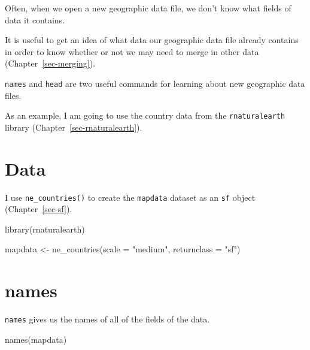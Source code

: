 \documentclass[
  letterpaper,
  DIV=11,
  numbers=noendperiod,
  oneside]{scrreprt}
\newenvironment{Shaded}{\begin{snugshade}}{\end{snugshade}}
\newcommand{\AttributeTok}[1]{\textcolor[rgb]{0.40,0.45,0.13}{#1}}
\newcommand{\FunctionTok}[1]{\textcolor[rgb]{0.28,0.35,0.67}{#1}}
\newcommand{\NormalTok}[1]{\textcolor[rgb]{0.00,0.23,0.31}{#1}}
\newcommand{\OtherTok}[1]{\textcolor[rgb]{0.00,0.23,0.31}{#1}}
\newcommand{\StringTok}[1]{\textcolor[rgb]{0.13,0.47,0.30}{#1}}
\begin{document}
Often, when we open a new geographic data file, we don't know what
fields of data it contains.

It is useful to get an idea of what data our geographic data file
already contains in order to know whether or not we may need to merge in
other data (Chapter~\ref{sec-merging}).

\texttt{names} and \texttt{head} are two useful commands for learning
about new geographic data files.

As an example, I am going to use the country data from the
\texttt{rnaturalearth} library (Chapter~\ref{sec-rnaturalearth}).

\section{Data}\label{data}

I use \texttt{ne\_countries()} to create the \texttt{mapdata} dataset as
an \texttt{sf} object (Chapter~\ref{sec-sf}).

\begin{Shaded}
\begin{Highlighting}[]
\FunctionTok{library}\NormalTok{(rnaturalearth) }

\NormalTok{mapdata }\OtherTok{\textless{}{-}} \FunctionTok{ne\_countries}\NormalTok{(}\AttributeTok{scale =} \StringTok{"medium"}\NormalTok{, }
                        \AttributeTok{returnclass =} \StringTok{"sf"}\NormalTok{) }
\end{Highlighting}
\end{Shaded}

\section{names}\label{names}

\texttt{names} gives us the names of all of the fields of the data.

\begin{Shaded}
\begin{Highlighting}[]
\FunctionTok{names}\NormalTok{(mapdata)}
\end{Highlighting}
\end{Shaded}
\end{document}
